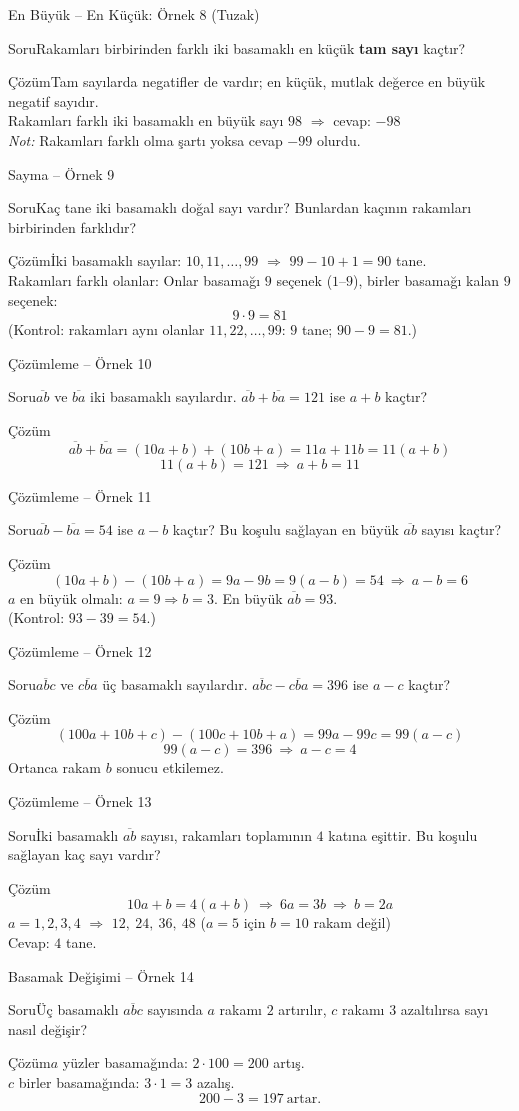 \documentclass[aspectratio=169,11pt]{beamer}
\newcommand{\soru}[3]{%
\begin{frame}{#1}
  \begin{block}{Soru}\large #2\end{block}
  \pause
  \begin{exampleblock}{Çözüm}\large #3\end{exampleblock}
\end{frame}}
\newcommand{\ab}[1]{\overline{#1}}
\begin{document}
\soru{En Büyük -- En Küçük: Örnek 8 (Tuzak)}
{Rakamları birbirinden farklı iki basamaklı en küçük \textbf{tam sayı} kaçtır?}
{Tam sayılarda negatifler de vardır; en küçük, mutlak değerce en büyük negatif sayıdır.\\[3pt]
Rakamları farklı iki basamaklı en büyük sayı \(98\) \(\Rightarrow\) cevap: \(-98\)\\[3pt]
\textit{Not:} Rakamları farklı olma şartı yoksa cevap \(-99\) olurdu.}

\soru{Sayma -- Örnek 9}
{Kaç tane iki basamaklı doğal sayı vardır? Bunlardan kaçının rakamları birbirinden farklıdır?}
{İki basamaklı sayılar: \(10,11,\dots,99\) \(\Rightarrow\) \(99-10+1=90\) tane.\\[3pt]
Rakamları farklı olanlar: Onlar basamağı \(9\) seçenek (\(1\)--\(9\)), birler basamağı kalan \(9\) seçenek:
\[9\cdot 9=81\]
(Kontrol: rakamları aynı olanlar \(11,22,\dots,99\): \(9\) tane; \(90-9=81\).)}

\soru{Çözümleme -- Örnek 10}
{\(\ab{ab}\) ve \(\ab{ba}\) iki basamaklı sayılardır. \(\ab{ab}+\ab{ba}=121\) ise \(a+b\) kaçtır?}
{\[\ab{ab}+\ab{ba}=(10a+b)+(10b+a)=11a+11b=11(a+b)\]
\[11(a+b)=121\ \Rightarrow\ a+b=11\]}

\soru{Çözümleme -- Örnek 11}
{\(\ab{ab}-\ab{ba}=54\) ise \(a-b\) kaçtır? Bu koşulu sağlayan en büyük \(\ab{ab}\) sayısı kaçtır?}
{\[(10a+b)-(10b+a)=9a-9b=9(a-b)=54\ \Rightarrow\ a-b=6\]
\(a\) en büyük olmalı: \(a=9\Rightarrow b=3\). \quad En büyük \(\ab{ab}=93\).\\[3pt]
(Kontrol: \(93-39=54\).)}

\soru{Çözümleme -- Örnek 12}
{\(\ab{abc}\) ve \(\ab{cba}\) üç basamaklı sayılardır. \(\ab{abc}-\ab{cba}=396\) ise \(a-c\) kaçtır?}
{\[(100a+10b+c)-(100c+10b+a)=99a-99c=99(a-c)\]
\[99(a-c)=396\ \Rightarrow\ a-c=4\]
Ortanca rakam \(b\) sonucu etkilemez.}

\soru{Çözümleme -- Örnek 13}
{İki basamaklı \(\ab{ab}\) sayısı, rakamları toplamının \(4\) katına eşittir. Bu koşulu sağlayan kaç sayı vardır?}
{\[10a+b=4(a+b)\ \Rightarrow\ 6a=3b\ \Rightarrow\ b=2a\]
\(a=1,2,3,4\) \(\Rightarrow\) \(12,\ 24,\ 36,\ 48\) \quad (\(a=5\) için \(b=10\) rakam değil)\\[3pt]
Cevap: \(4\) tane.}

\soru{Basamak Değişimi -- Örnek 14}
{Üç basamaklı \(\ab{abc}\) sayısında \(a\) rakamı \(2\) artırılır, \(c\) rakamı \(3\) azaltılırsa sayı nasıl değişir?}
{\(a\) yüzler basamağında: \(2\cdot 100=200\) artış.\\
\(c\) birler basamağında: \(3\cdot 1=3\) azalış.
\[200-3=197\ \text{artar.}\]}
\end{document}
